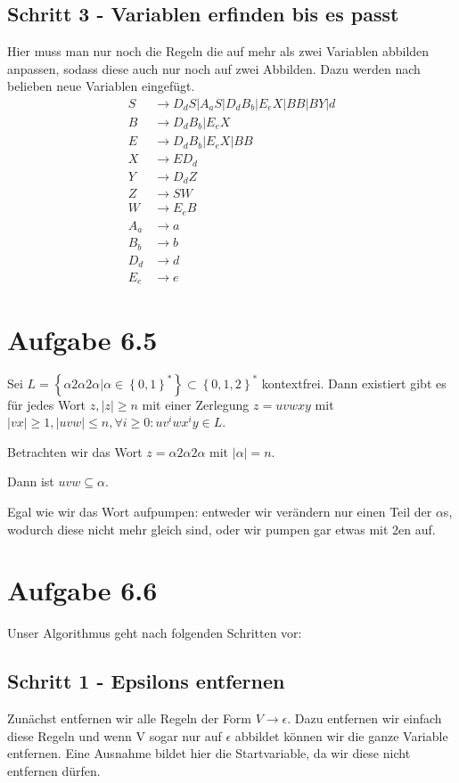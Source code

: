 \documentclass{article}
\begin{document}
\subsection*{Schritt 3 - Variablen erfinden bis es passt}
Hier muss man nur noch die Regeln die auf mehr als zwei Variablen abbilden anpassen, sodass diese auch nur noch auf zwei Abbilden. Dazu werden nach belieben neue Variablen eingefügt.
\begin{align*}
S&\rightarrow D_dS | A_aS | D_dB_b | E_eX | BB | BY | d\\
B&\rightarrow D_dB_b | E_eX\\
E&\rightarrow D_dB_b | E_eX | BB\\
X&\rightarrow ED_d \\
Y&\rightarrow D_dZ \\
Z&\rightarrow SW \\
W&\rightarrow E_eB \\
A_a&\rightarrow a\\
B_b&\rightarrow b\\
D_d&\rightarrow d\\
E_e&\rightarrow e
\end{align*}



\section*{Aufgabe 6.5}
Sei $L = \left\{\alpha 2 \alpha 2 \alpha | \alpha \in \left\{0,1\right\}^* \right\} \subset \left\{0,1,2\right\}^*$ kontextfrei. Dann existiert gibt es für jedes Wort $z, |z|\geq n$ mit einer Zerlegung $z=uvwxy$ mit $|vx|\geq 1, |uvw|\leq n, \forall i \geq 0: uv^iwx^iy \in L$.

Betrachten wir das Wort $z = \alpha 2 \alpha 2 \alpha$ mit $|\alpha|=n$.

Dann ist $uvw \subseteq \alpha$. 

Egal wie wir das Wort aufpumpen: entweder wir verändern nur einen Teil der $\alpha$s, wodurch diese nicht mehr gleich sind, oder wir pumpen gar etwas mit 2en auf.



\section*{Aufgabe 6.6}
Unser Algorithmus geht nach folgenden Schritten vor:
\subsection*{Schritt 1 - Epsilons entfernen}
Zunächst entfernen wir alle Regeln der Form $V\rightarrow \epsilon$. Dazu entfernen wir einfach diese Regeln und wenn V sogar nur auf $\epsilon$ abbildet können wir die ganze Variable entfernen. Eine Ausnahme bildet hier die Startvariable, da wir diese nicht entfernen dürfen.
\end{document}
